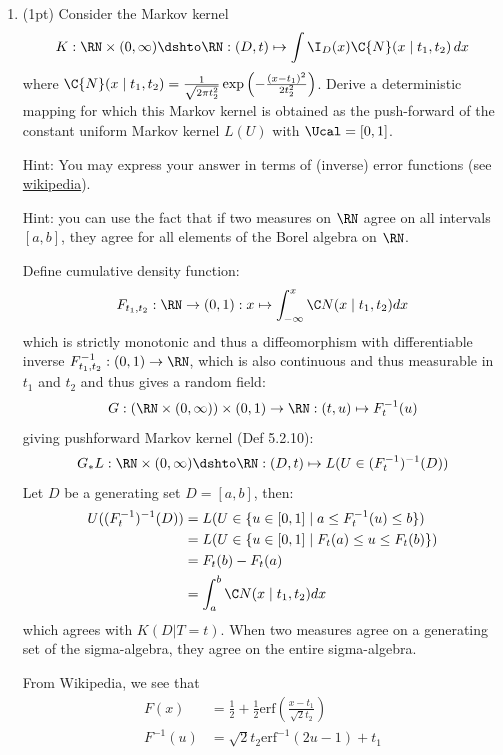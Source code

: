 \begin{enumerate}
  \item (1pt) Consider the Markov kernel 
    $$K : \RN\times(0,\infty) \dshto \RN : (D,t) \mapsto \int \I_D(x) \C{N}(x \mid t_1,t_2) \,dx$$
    where $\C{N}(x \mid t_1,t_2) = \frac{1}{\sqrt{2\pi t_2^2}} \exp\left(-\frac{(x-t_1)^2}{2 t_2^2}\right)$.
    Derive a deterministic mapping for which this Markov kernel is obtained as the push-forward of the constant uniform Markov kernel $L(U)$ with $\Ucal = [0,1]$.
    
    Hint: You may express your answer in terms of (inverse) error functions (see \href{https://en.wikipedia.org/wiki/Error_function}{wikipedia}).

    Hint: you can use the fact that if two measures on $\RN$ agree on all intervals $[a, b]$, they agree for all elements of the Borel algebra on $\RN$.

    \begin{gradedsolution}
      Define cumulative density function:
      \[
      F_{t_1,t_2} : \RN \to (0, 1) : x \mapsto \int_{-\infty}^x \C N(x \mid t_1, t_2)dx
      \]
      which is strictly monotonic and thus a diffeomorphism with differentiable inverse $F^{-1}_{t_1,t_2}: (0,1) \to \RN$, which is also continuous and thus measurable in $t_1$ and $t_2$ and thus gives a random field:
      \[
        G :(\RN \times (0, \infty)) \times (0,1) \to \RN : (t, u) \mapsto F^{-1}_t(u)
      \]
      giving pushforward Markov kernel (Def 5.2.10):
      \[
        G_*L: \RN \times (0, \infty)  \dshto \RN : (D, t) \mapsto L(U \in (F_t^{-1})^{-1}(D))
      \]
      Let $D$ be a generating set $D=[a,b]$, then:
      \begin{align*}
        U((F_t^{-1})^{-1}(D))
        &= L(U \in \{u \in [0,1] \mid a \le F^{-1}_t(u) \le b \}) \\
        &= L(U \in \{u \in [0,1] \mid F_t(a) \le u \le F_t(b) \}) \\
        &= F_t(b)-F_t(a) \\
        &= \int^b_a \C N(x \mid t_1, t_2)dx\\
      \end{align*}
      which agrees with $K(D|T=t)$. When two measures agree on a generating set of the sigma-algebra, they agree on the entire sigma-algebra.

      From Wikipedia, we see that
      \begin{align*}
        F(x)&=\frac{1}{2}+ \frac{1}{2}\text{erf}(\frac{x-t_1}{\sqrt{2}t_2})\\
        F^{-1}(u)&=\sqrt{2}t_2 \text{erf}^{-1}(2u-1)+t_1
      \end{align*}


\end{gradedsolution}
\end{enumerate}
